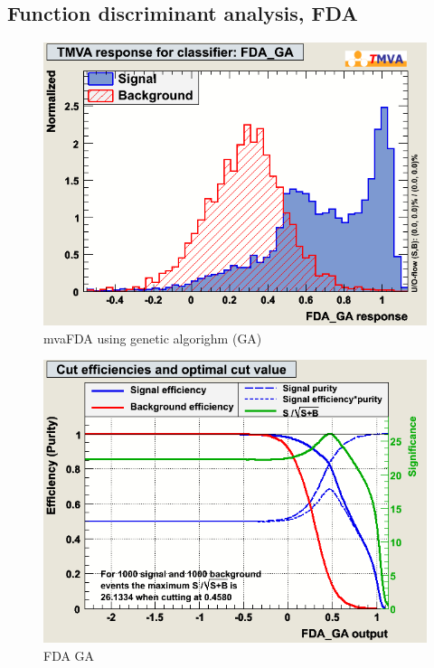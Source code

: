 \subsection{Function discriminant analysis, FDA}

\begin{figure}[h]
\begin{center}
\includegraphics[width=1.0\textwidth]{images/pkMva_FDA_GA.png}
\caption{mvaFDA using genetic algorighm (GA)}
\label{fig:pkMvaFDAGA}
\end{center}
\end{figure}

\begin{figure}[h]
\begin{center}
\includegraphics[width=1.0\textwidth]{images/pkMvaEffs_FDA_GA.png}
\caption{FDA GA }
\label{fig:pkMvaEffsFDAGA}
\end{center}
\end{figure}

